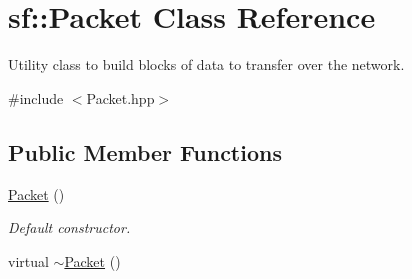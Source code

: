 \hypertarget{classsf_1_1_packet}{\section{sf\+:\+:Packet Class Reference}
\label{classsf_1_1_packet}
}


Utility class to build blocks of data to transfer over the network.  




{\ttfamily \#include $<$Packet.\+hpp$>$}

\subsection*{Public Member Functions}
\begin{DoxyCompactItemize}
\item 
\hyperlink{classsf_1_1_packet_a786e5d4ced83992ceefa1799963ea858}{Packet} ()
\begin{DoxyCompactList}\small\item\em Default constructor. \end{DoxyCompactList}\item 
\hypertarget{classsf_1_1_packet_adc0490ca3c7c3d1e321bd742e5213913}{virtual \hyperlink{classsf_1_1_packet_adc0490ca3c7c3d1e321bd742e5213913}{$\sim$\+Packet} ()}\label{classsf_1_1_packet_adc0490ca3c7c3d1e321bd742e5213913}


\end{DoxyCompactItemize}
